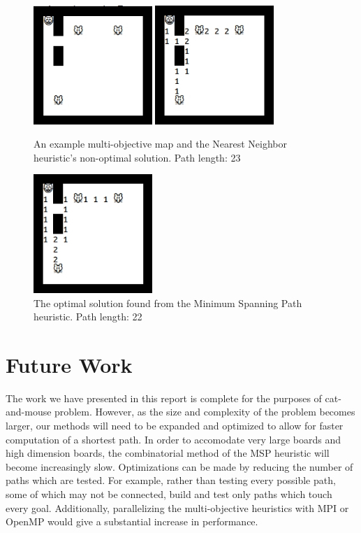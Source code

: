 \documentclass[12pt, conference, compsocconf]{IEEEtran}
\begin{document}
\begin{figure}[t]
    \centering
    \includegraphics[width=0.4\textwidth]{map_mo.jpg}
    \includegraphics[width=0.4\textwidth]{map_mo_nonopt.jpg}
    \caption{An example multi-objective map and the Nearest Neighbor
heuristic's non-optimal solution.  Path length: 23}
    \label{nonopt}
\end{figure}
\begin{figure}[t]
    \centering
    \includegraphics[width=0.4\textwidth]{map_mo_opt.jpg}
    \caption{The optimal solution found from the Minimum Spanning Path
heuristic.  Path length: 22}
    \label{opt}
\end{figure}

\section{Future Work}
The work we have presented in this report is complete for the purposes of
cat-and-mouse problem.  However, as the size and complexity of the problem
becomes larger, our methods will need to be expanded and optimized to allow for
faster computation of a shortest path.  In order to accomodate very large
boards and high dimension boards, the combinatorial method of the MSP heuristic
will become increasingly slow.  Optimizations can be made by reducing the
number of paths which are tested.  For example, rather than testing every
possible path, some of which may not be connected, build and test only paths
which touch every goal.  Additionally, parallelizing the multi-objective
heuristics with MPI or OpenMP would give a substantial increase in performance.
\end{document}
